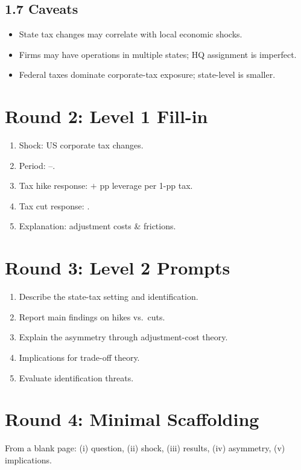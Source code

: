 \documentclass[11pt]{article}
\newcommand{\blank}[1]{\underline{\hspace{#1}}}
\begin{document}
\subsection*{1.7 Caveats}
\begin{alertbox}
\begin{itemize}
\item State tax changes may correlate with local economic shocks.
\item Firms may have operations in multiple states; HQ assignment is imperfect.
\item Federal taxes dominate corporate-tax exposure; state-level is smaller.
\end{itemize}
\end{alertbox}

\section*{Round 2: Level 1 Fill-in}
\begin{enumerate}
\item Shock: US \blank{2cm} corporate tax changes.
\item Period: \blank{1cm}--\blank{1cm}.
\item Tax hike response: $+$\blank{1cm} pp leverage per 1-pp tax.
\item Tax cut response: \blank{2cm}.
\item Explanation: adjustment costs \& \blank{2cm} frictions.
\end{enumerate}

\section*{Round 3: Level 2 Prompts}
\begin{enumerate}
\item Describe the state-tax setting and identification.
\item Report main findings on hikes vs.\ cuts.
\item Explain the asymmetry through adjustment-cost theory.
\item Implications for trade-off theory.
\item Evaluate identification threats.
\end{enumerate}

\section*{Round 4: Minimal Scaffolding}
From a blank page: (i) question, (ii) shock, (iii) results, (iv) asymmetry, (v) implications.
\end{document}
